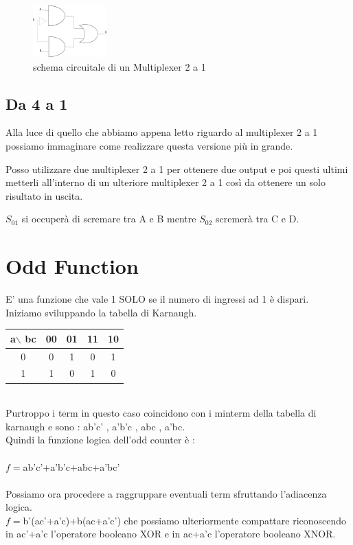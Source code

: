 \documentclass[a4paper]{book}
\begin{document}
\begin{figure}
\centering
\includegraphics{Multiplexer21Circuito}
\caption{schema circuitale di un Multiplexer 2 a 1}
\end{figure}


\subsection{Da 4 a 1}

Alla luce di quello che abbiamo appena letto riguardo al multiplexer 2 a 1 possiamo immaginare come realizzare questa versione più in grande.

Posso utilizzare due multiplexer 2 a 1 per ottenere due output e poi questi ultimi metterli all'interno di un ulteriore multiplexer 2 a 1 così da ottenere un solo risultato in uscita.

\(S_01 \) si occuperà di scremare tra A e B mentre \(S_02 \) scremerà tra C e D.


\section{Odd Function}

E' una funzione che vale 1 SOLO se il numero di ingressi ad 1 è dispari.\\
Iniziamo sviluppando la tabella di Karnaugh.\\

\vspace{\baselineskip}

\begin{tabular}{|c|c|c|c|c|}
\hline
a$\backslash$ bc & 00 & 01 & 11 & 10 \\
\hline
0              & 0  &  \cellcolor{yellow}1 & 0  & \cellcolor{yellow}1  \\
\hline
1              & \cellcolor{yellow}1  &  0 & \cellcolor{yellow}1  & 0  \\
\hline
\end{tabular}
\vspace{\baselineskip}\\
Purtroppo i term in questo caso coincidono con i minterm della tabella di karnaugh e sono : ab'c' , a'b'c , abc , a'bc.\\
Quindi la funzione logica dell'odd counter è :
\\\\
\(f=\)ab'c'+a'b'c+abc+a'bc'
\\\\
Possiamo ora procedere a raggruppare eventuali term sfruttando l'adiacenza logica.
\\
\(f=\)b'(ac'+a'c)+b(ac+a'c') che possiamo ulteriormente compattare riconoscendo in ac'+a'c l'operatore booleano XOR e in ac+a'c l'operatore booleano XNOR.
\end{document}
